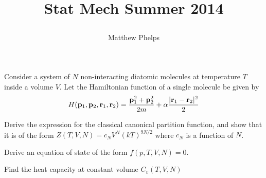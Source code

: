 \documentclass[10pt,letterpaper]{article}
\title{\begin{spacing}{1.2}Stat Mech Summer 2014\end{spacing}}
\author{Matthew Phelps}
\date{}
\begin{document}
\maketitle

\benum
  	 \item
	Consider a system of $N$ non-interacting diatomic molecules at temperature $T$ inside a volume $V$. 
	Let the Hamiltonian function of a single molecule be given by
	\[
		H(\mathbf{p}_1,\mathbf{p}_2, \mathbf{r}_1,\mathbf{r}_2) = \frac{\mathbf{p}_1^2+\mathbf{p}_2^2}{2m} 
		+\alpha \frac{ |\mathbf{r}_1-\mathbf{r}_2|^2}{2}
	\]
	
	\benum
	\item
	Derive the expression for the classical canonical partition function, and show that it is
	of the form $Z(T,V,N) = c_N V^N(kT)^{9N/2}$ where $c_N$ is a function of $N$. 
	\item
	Derive an equation of state of the form $f(p,T,V,N) = 0$.
	\item
	Find the heat capacity at constant volume $C_v(T,V,N)$ \\ \\ \\
	\eenum
	
\end{document}

